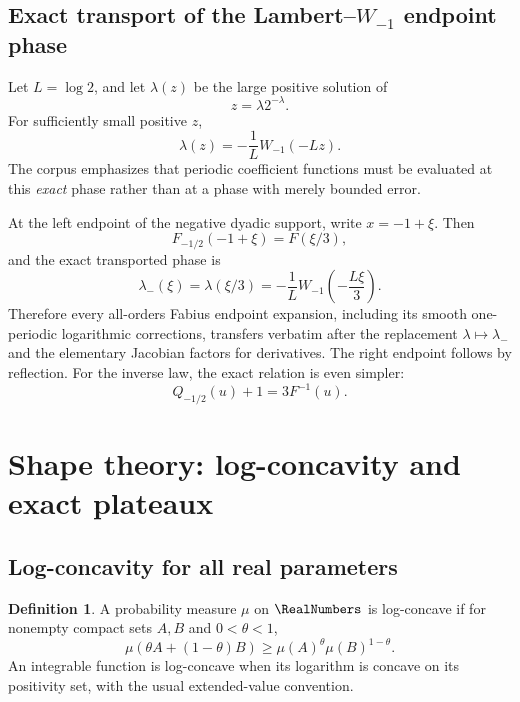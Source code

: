 \documentclass[11pt]{article}
\theoremstyle{definition}
\newtheorem{definition}[theorem]{Definition}
\begin{document}
\subsection{Exact transport of the Lambert--\texorpdfstring{$W_{-1}$}{W-1} endpoint phase}

Let \(L=\log2\), and let \(\lambda(z)\) be the large positive solution of
\begin{equation}
 z=\lambda2^{-\lambda}.
\end{equation}
For sufficiently small positive \(z\),
\begin{equation}
 \lambda(z)=-\frac1L W_{-1}(-Lz).                         \label{eq:lambert-phase}
\end{equation}
The corpus emphasizes that periodic coefficient functions must be evaluated at this
\emph{exact} phase rather than at a phase with merely bounded error.

At the left endpoint of the negative dyadic support, write \(x=-1+\xi\).  Then
\begin{equation}
 F_{-1/2}(-1+\xi)=F(\xi/3),                               \label{eq:endpoint-transport}
\end{equation}
and the exact transported phase is
\begin{equation}
 \boxed{
 \lambda_-(\xi)=\lambda(\xi/3)
 =-\frac1L W_{-1}\!\left(-\frac{L\xi}{3}\right).}        \label{eq:negative-lambert-phase}
\end{equation}
Therefore every all-orders Fabius endpoint expansion, including its smooth one-periodic
logarithmic corrections, transfers verbatim after the replacement
\(\lambda\mapsto\lambda_-\) and the elementary Jacobian factors for derivatives.  The
right endpoint follows by reflection.  For the inverse law, the exact relation is even
simpler:
\begin{equation}
 Q_{-1/2}(u)+1=3F^{-1}(u).                                \label{eq:inverse-endpoint-transport}
\end{equation}

\section{Shape theory: log-concavity and exact plateaux}

\subsection{Log-concavity for all real parameters}

\begin{definition}
A probability measure \(\mu\) on \(\RealNumbers\) is log-concave if for nonempty compact sets
\(A,B\) and \(0<\theta<1\),
\[
 \mu(\theta A+(1-\theta)B)
 \ge \mu(A)^\theta\mu(B)^{1-\theta}.
\]
An integrable function is log-concave when its logarithm is concave on its positivity
set, with the usual extended-value convention.
\end{definition}
\end{document}
